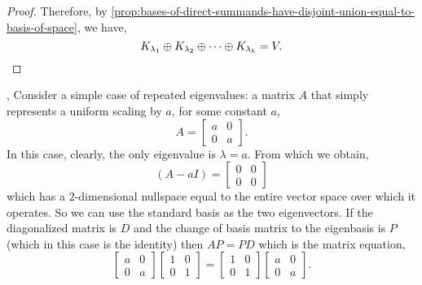 \documentclass[../MathsNotesBase.tex]{subfiles}
\begin{document}
{\begin{proof}
			Therefore, by \autoref{prop:bases-of-direct-summands-have-disjoint-union-equal-to-basis-of-space}, we have,
			\[ K_{\lambda_1} \oplus K_{\lambda_2} \oplus \cdots \oplus K_{\lambda_k} = V. \qedhere\]
		\end{proof}
		
		
		\sep
		Consider a simple case of repeated eigenvalues: a matrix $A$ that simply represents a uniform scaling by $a$, for some constant $a$,
		\[ 
		A = \begin{bmatrix}
			a & 0\\
			0 & a
		\end{bmatrix}.
		\]
		In this case, clearly, the only eigenvalue is ${ \lambda = a }$. From which we obtain,
		\[ (A - aI) = 	\begin{bmatrix}
			0 & 0\\
			0 & 0
		\end{bmatrix}
		\]
		which has a 2-dimensional nullspace equal to the entire vector space over which it operates. So we can use the standard basis as the two eigenvectors. If the diagonalized matrix is $D$ and the change of basis matrix to the eigenbasis is $P$ (which in this case is the identity) then ${ AP = PD }$ which is the matrix equation,
		\[ 
		\begin{bmatrix}
			a & 0\\
			0 & a
		\end{bmatrix}
		\begin{bmatrix}
			1 & 0\\
			0 & 1
		\end{bmatrix} =
		\begin{bmatrix}
			1 & 0\\
			0 & 1
		\end{bmatrix}
		\begin{bmatrix}
			a & 0\\
			0 & a
		\end{bmatrix}.
		\]
		
}
\end{document}
